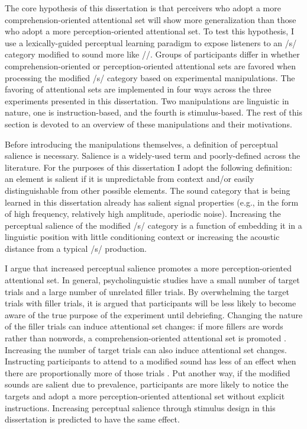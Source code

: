 The core hypothesis of this dissertation is that perceivers who adopt a more comprehension-oriented attentional set will show more generalization than those who adopt a more perception-oriented attentional set.
To test this hypothesis, I use a lexically-guided perceptual learning paradigm to expose listeners to an /s/ category modified to sound more like /\textesh/.  
Groups of participants differ in whether comprehension-oriented or perception-oriented attentional sets are favored when processing the modified /s/ category based on experimental manipulations.
The favoring of attentional sets are implemented in four ways across the three experiments presented in this dissertation.  
Two manipulations are linguistic in nature, one is instruction-based, and the fourth is stimulus-based.
The rest of this section is devoted to an overview of these manipulations and their motivations.

Before introducing the manipulations themselves, a definition of perceptual salience is necessary.
Salience is a widely-used term and poorly-defined across the literature.
For the purposes of this dissertation I adopt the following definition:  an element is salient if it is unpredictable from context and/or easily distinguishable from other possible elements.  
The sound category that is being learned in this dissertation already has salient signal properties (e.g., in the form of high frequency, relatively high amplitude, aperiodic noise).
Increasing the perceptual salience of the modified /s/ category is a function of embedding it in a linguistic position with little conditioning context or increasing the acoustic distance from a typical /s/ production.

I argue that increased perceptual salience promotes a more perception-oriented attentional set.
In general, psycholinguistic studies have a small number of target trials and a large number of unrelated filler trials.
By overwhelming the target trials with filler trials, it is argued that participants will be less likely to become aware of the true purpose of the experiment until debriefing.
Changing the nature of the filler trials can induce attentional set changes: if more fillers are words rather than nonwords, a comprehension-oriented attentional set is promoted \citep{Mirman2008}.
Increasing the number of target trials can also induce attentional set changes.
Instructing participants to attend to a modified sound has less of an effect when there are proportionally more of those trials \citep{Pitt2012}.
Put another way, if the modified sounds are salient due to prevalence, participants are more likely to notice the targets and adopt a more perception-oriented attentional set without explicit instructions.
Increasing perceptual salience through stimulus design in this dissertation is predicted to have the same effect.

